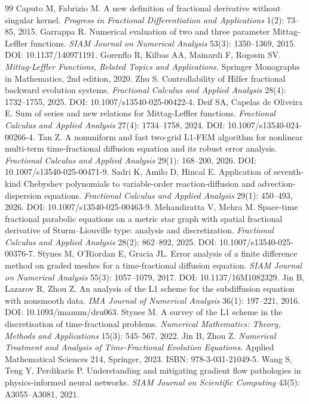 \documentclass[11pt]{article}
\begin{document}
\begin{thebibliography}{99}
 Caputo M, Fabrizio M. A new definition of fractional derivative without singular kernel. \emph{Progress in Fractional Differentiation and Applications} 1(2): 73--85, 2015.
 Garrappa R. Numerical evaluation of two and three parameter Mittag-Leffler functions. \emph{SIAM Journal on Numerical Analysis} 53(3): 1350--1369, 2015. DOI: 10.1137/140971191.
 Gorenflo R, Kilbas AA, Mainardi F, Rogosin SV. \emph{Mittag-Leffler Functions, Related Topics and Applications}. Springer Monographs in Mathematics, 2nd edition, 2020.
 Zhu S. Controllability of Hilfer fractional backward evolution systems. \emph{Fractional Calculus and Applied Analysis} 28(4): 1732--1755, 2025. DOI: 10.1007/s13540-025-00422-4.
 Deif SA, Capelas de Oliveira E. Sum of series and new relations for Mittag-Leffler functions. \emph{Fractional Calculus and Applied Analysis} 27(4): 1734--1758, 2024. DOI: 10.1007/s13540-024-00266-4.
 Tan Z. A nonuniform and fast two-grid L1-FEM algorithm for nonlinear multi-term time-fractional diffusion equation and its robust error analysis. \emph{Fractional Calculus and Applied Analysis} 29(1): 168--200, 2026. DOI: 10.1007/s13540-025-00471-9.
 Sadri K, Amilo D, Hincal E. Application of seventh-kind Chebyshev polynomials to variable-order reaction-diffusion and advection-dispersion equations. \emph{Fractional Calculus and Applied Analysis} 29(1): 450--493, 2026. DOI: 10.1007/s13540-025-00463-9.
 Mehandiratta V, Mehra M. Space-time fractional parabolic equations on a metric star graph with spatial fractional derivative of Sturm--Liouville type: analysis and discretization. \emph{Fractional Calculus and Applied Analysis} 28(2): 862--892, 2025. DOI: 10.1007/s13540-025-00376-7.
 Stynes M, O'Riordan E, Gracia JL. Error analysis of a finite difference method on graded meshes for a time-fractional diffusion equation. \emph{SIAM Journal on Numerical Analysis} 55(3): 1057--1079, 2017. DOI: 10.1137/16M1082329.
 Jin B, Lazarov R, Zhou Z. An analysis of the L1 scheme for the subdiffusion equation with nonsmooth data. \emph{IMA Journal of Numerical Analysis} 36(1): 197--221, 2016. DOI: 10.1093/imanum/dru063.
 Stynes M. A survey of the L1 scheme in the discretisation of time-fractional problems. \emph{Numerical Mathematics: Theory, Methods and Applications} 15(3): 545--567, 2022.
 Jin B, Zhou Z. \emph{Numerical Treatment and Analysis of Time-Fractional Evolution Equations}. Applied Mathematical Sciences 214, Springer, 2023. ISBN: 978-3-031-21049-5.
 Wang S, Teng Y, Perdikaris P. Understanding and mitigating gradient flow pathologies in physics-informed neural networks. \emph{SIAM Journal on Scientific Computing} 43(5): A3055--A3081, 2021.
\end{thebibliography}
\end{document}
